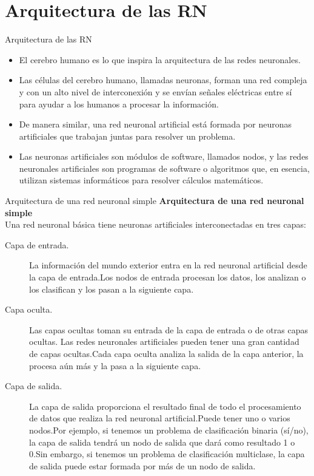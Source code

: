 \documentclass[11pt,aspectratio=169]{beamer}
\begin{document}
\section{Arquitectura de las RN}
\begin{frame}{Arquitectura de las RN}
	\begin{itemize}
		\item El cerebro humano es lo que inspira la arquitectura de las redes neuronales. \pause
		\item Las células del cerebro humano, llamadas neuronas, forman una red compleja y con un alto nivel de interconexión 
			y se envían señales eléctricas entre sí para ayudar a los humanos a procesar la información. \pause
		\item De manera similar, una red neuronal artificial está formada por neuronas artificiales que trabajan 
			juntas para resolver un problema.\pause 
		\item Las neuronas artificiales son módulos de software, llamados nodos, y las redes neuronales artificiales son 
			programas de software o algoritmos que, en esencia, utilizan sistemas informáticos para resolver cálculos matemáticos.
	\end{itemize}
\end{frame}

\begin{frame}{Arquitectura de una red neuronal simple}
	\textbf{Arquitectura de una red neuronal simple}\\
	Una red neuronal básica tiene neuronas artificiales interconectadas en tres capas:
	\begin{description}
		\item[Capa de entrada.] La información del mundo exterior entra en la red neuronal artificial desde la 
			capa de entrada.\pause Los nodos de entrada procesan los datos, los analizan o los clasifican y los pasan 
			a la siguiente capa.
		\item[Capa oculta. ] Las capas ocultas toman su entrada de la capa de entrada o de otras capas ocultas. \pause
			Las redes neuronales artificiales pueden tener una gran cantidad de capas ocultas.\pause Cada capa oculta 
			analiza la salida de la capa anterior, la procesa aún más y la pasa a la siguiente capa.\pause
		\item[Capa de salida. ] La capa de salida proporciona el resultado final de todo el procesamiento de datos 
			que realiza la red neuronal artificial.\pause Puede tener uno o varios nodos.\pause Por ejemplo, si tenemos 
			un problema de clasificación binaria (sí/no), la capa de salida tendrá un nodo de salida que dará como 
			resultado 1 o 0.\pause Sin embargo, si tenemos un problema de clasificación multiclase, la capa de salida 
			puede estar formada por más de un nodo de salida.
	\end{description}
\end{frame}
\end{document}
